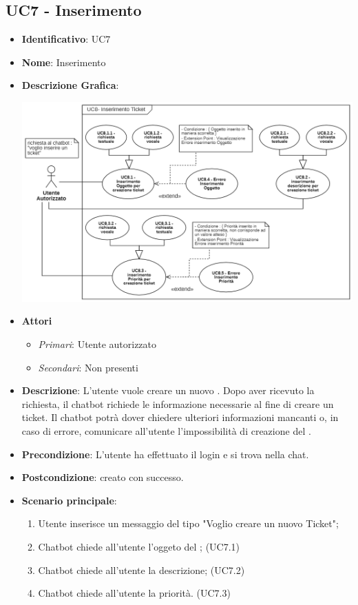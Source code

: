 \subsection{UC7 - Inserimento }
\begin{itemize}
	\item \textbf{Identificativo}: UC7
	\item \textbf{Nome}: Inserimento 
	\item\textbf{Descrizione Grafica}: 
	\begin{center}
		\includegraphics[scale=0.65]{images/UC7.png} 
	\end{center}

	\item \textbf{Attori}
	\begin{itemize} 
		\item \textit{Primari}: Utente autorizzato
		\item \textit{Secondari}: Non presenti 
	\end{itemize}
	\item \textbf{Descrizione}: L'utente vuole creare un nuovo . Dopo aver ricevuto la richiesta, il chatbot richiede le informazione necessarie al fine di creare un ticket. Il chatbot potrà dover chiedere ulteriori informazioni mancanti o, in caso di errore, comunicare all'utente l'impossibilità di creazione del .
	\item \textbf{Precondizione}: L'utente ha effettuato il login e si trova nella chat.
	\item \textbf{Postcondizione}:  creato con successo.
	\item \textbf{Scenario principale}: \begin{enumerate}
		\item Utente inserisce un messaggio del tipo "Voglio creare un nuovo Ticket";
		\item Chatbot chiede all'utente l'oggeto del ; (UC7.1)
    \item Chatbot chiede all'utente la descrizione; (UC7.2)
		\item Chatbot chiede all'utente la priorità. (UC7.3)
	\end{enumerate}
\end{itemize}


